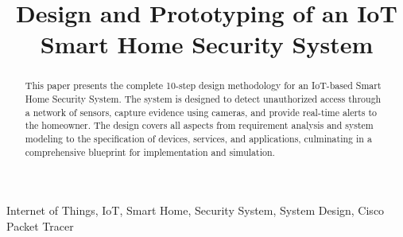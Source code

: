 \documentclass[conference]{IEEEtran}
\begin{document}
\title{Design and Prototyping of an IoT Smart Home Security System\\
}

\author{
\and
{}
\and
{}
\and
{}
\and
{}
}

\maketitle

\begin{abstract}
This paper presents the complete 10-step design methodology for an IoT-based Smart Home Security System. The system is designed to detect unauthorized access through a network of sensors, capture evidence using cameras, and provide real-time alerts to the homeowner. The design covers all aspects from requirement analysis and system modeling to the specification of devices, services, and applications, culminating in a comprehensive blueprint for implementation and simulation.
\end{abstract}

\begin{IEEEkeywords}
Internet of Things, IoT, Smart Home, Security System, System Design, Cisco Packet Tracer
\end{IEEEkeywords}
\end{document}
